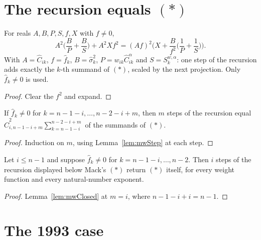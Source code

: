 \section{The recursion equals $(*)$}

\begin{lemma}\label{lem:mwStep}\leanok
For reals $A, B, P, S, f, X$ with $f \neq 0$,
\[
  A^2\Big(\frac{B}{P} + \frac{B}{S}\Big) + A^2 X f^2
   = (Af)^2\Big(X + \frac{B}{f^2}\Big(\frac{1}{P} + \frac{1}{S}\Big)\Big).
\]
With $A = \hat C_{ik}$, $f = \hat f_k$, $B = \hat\sigma_k^2$, $P = w_{ik}\hat C_{ik}^{\alpha}$
and $S = S_k^{w,\alpha}$: one step of the recursion adds exactly the $k$-th summand of $(*)$,
scaled by the next projection. Only $\hat f_k \neq 0$ is used.
\end{lemma}
\begin{proof}\leanok Clear the $f^2$ and expand. \end{proof}

\begin{lemma}\label{lem:mwClosed}\leanok
{}
If $\hat f_k \neq 0$ for $k = n-1-i, \dots, n-2-i+m$, then $m$ steps of the recursion equal
$\hat C_{i,n-1-i+m}^2 \sum_{k=n-1-i}^{n-2-i+m}$ of the summands of $(*)$.
\end{lemma}
\begin{proof}\leanok Induction on $m$, using Lemma~\ref{lem:mwStep} at each step. \end{proof}

\begin{theorem}\label{thm:mwRecursion}\leanok
{}
Let $i \le n-1$ and suppose $\hat f_k \neq 0$ for $k = n-1-i, \dots, n-2$. Then $i$ steps of
the recursion displayed below Mack's $(*)$ return $(*)$ itself, for every weight function and
every natural-number exponent.
\end{theorem}
\begin{proof}\leanok Lemma~\ref{lem:mwClosed} at $m = i$, where $n-1-i+i = n-1$. \end{proof}

\section{The 1993 case}

